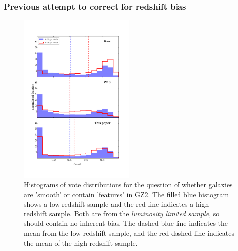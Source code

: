 \documentclass[useAMS,usenatbib]{mn2e}
\begin{document}
\subsubsection{Previous attempt to correct for redshift bias}
\label{sec:previous_method}

\begin{figure}
		\centering

        \includegraphics[width=0.5\textwidth]{Data_imgs/vote_distribution_histograms.pdf}

        \caption{Histograms of vote distributions for the question of whether galaxies are 'smooth' or contain 'features' in GZ2. The filled blue histogram shows a low redshift sample and the red line indicates a high redshift sample. Both are from the \textit{luminosity limited sample}, so should contain no inherent bias. The dashed blue line indicates the mean from the low redshift sample, and the red dashed line indicates the mean of the high redshift sample.}

        \label{fig:vote_histograms}

\end{figure}
\end{document}
